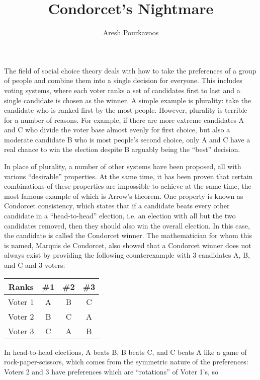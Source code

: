 \documentclass{article}
\begin{document}
\title{Condorcet's Nightmare}
\author{Aresh Pourkavoos}
\maketitle

The field of social choice theory deals with
how to take the preferences of a group of people
and combine them into a single decision for everyone.
This includes voting systems,
where each voter ranks a set of candidates first to last
and a single candidate is chosen as the winner.
A simple example is plurality:
take the candidate who is ranked first by the most people.
However, plurality is terrible for a number of reasons.
For example, if there are more extreme candidates A and C
who divide the voter base almost evenly for first choice,
but also a moderate candidate B who is most people's second choice,
only A and C have a real chance to win the election
despite B arguably being the ``best'' decision.

In place of plurality, a number of other systems have been proposed,
all with various ``desirable'' properties.
At the same time, it has been proven
that certain combinations of these properties are impossible to achieve at the same time,
the most famous example of which is Arrow's theorem.
One property is known as Condorcet consistency,
which states that if a candidate beats every other candidate in a ``head-to-head'' election,
i.e. an election with all but the two candidates removed,
then they should also win the overall election.
In this case, the candidate is called the Condorcet winner.
The mathematician for whom this is named, Marquis de Condorcet,
also showed that a Condorcet winner does not always exist
by providing the following counterexample
with 3 candidates A, B, and C and 3 voters:

\begin{center}
  \begin{tabular}{|c|c c c|}
    \hline
    Ranks & \#1 & \#2 & \#3 \\ \hline
    Voter 1 & A & B & C \\ \hline
    Voter 2 & B & C & A \\ \hline
    Voter 3 & C & A & B \\ \hline
  \end{tabular}
\end{center}

In head-to-head elections,
A beats B, B beats C, and C beats A
like a game of rock-paper-scissors,
which comes from the symmetric nature of the preferences:
Voters 2 and 3 have preferences which are ``rotations'' of Voter 1's,
so
\end{document}
